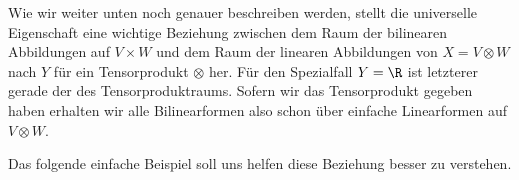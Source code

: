 \documentclass[letterpaper,10pt,english]{jupyterBook}
\begin{document}
\sphinxAtStartPar
{}

\sphinxAtStartPar
Wie wir weiter unten noch genauer beschreiben werden, stellt die universelle Eigenschaft eine wichtige Beziehung zwischen dem Raum der bilinearen Abbildungen auf \(V\times W\) und dem Raum der linearen Abbildungen von \(X = V\otimes W\) nach \(Y\) für ein Tensorprodukt \(\otimes\) her.
Für den Spezialfall \(Y = \R\) ist letzterer gerade der  des Tensorproduktraums.
Sofern wir das Tensorprodukt gegeben haben erhalten wir alle Bilinearformen also schon über einfache Linearformen auf \(V\otimes W\).

\sphinxAtStartPar
Das folgende einfache Beispiel soll uns helfen diese Beziehung besser zu verstehen.
\label{vektoranalysis/tensor:ex:universelleEigenschaft}
\end{document}
